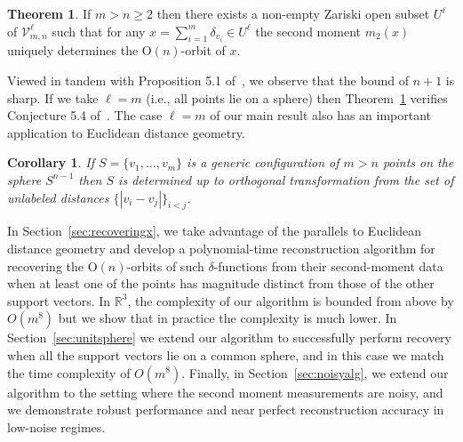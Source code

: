 \documentclass{article}
\newtheorem{Corollary}[]{Corollary}
\theoremstyle{definition}
\newtheorem{Theorem}{Theorem}
\renewcommand{\|}{|}
\newcommand{\V}{\mathcal{V}}
\renewcommand{\O}{\mathrm{O}}
\begin{document}
\begin{Theorem}\label{thm:mainthm}
If $m > n \geq 2$ then there exists a non-empty Zariski open subset $U^{\ell}$ of $\V^{\ell}_{m,n}$ such that for any $
x = \sum_{i=1}^m\delta_{v_i} \in U^\ell$
the second moment $m_2(x)$ uniquely determines the $\O(n)$-orbit of $x$.
\end{Theorem}
Viewed in tandem with Proposition 5.1 of~\cite{bendory2024beltway}, we observe that the bound of $n+1$ is sharp.  If we take $\ell =m$
(i.e., all points lie on a sphere) then 
Theorem~\ref{thm:mainthm} verifies Conjecture 5.4 of~\cite{bendory2024beltway}. 
The case $\ell = m$ of our main result also has an important application
to Euclidean distance geometry. 
\begin{Corollary} \label{cor.interpoint}
If $S = \{v_1, \ldots , v_m\}$ is a generic configuration of $m > n$ points on the sphere $S^{n-1}$
 then $S$ is determined up to orthogonal transformation from the set of unlabeled distances
 $\{|v_i  - v_j|\}_{i < j}$.
\end{Corollary}


In Section~\ref{sec:recoveringx}, we take advantage of the parallels to Euclidean distance geometry and develop a polynomial-time reconstruction algorithm for recovering the $\O(n)$-orbits of such $\delta$-functions
from their second-moment data when at least one of the points has magnitude distinct from those of the other support vectors. In $\mathbb{R}^3$, the complexity of our algorithm is bounded from above by $O(m^8)$ but we show that in practice the complexity is much lower.
In Section~\ref{sec:unitsphere} we extend our algorithm to successfully perform recovery when all
the support vectors lie on a common sphere, 
and in this case we match the time complexity of $O(m^8)$.
Finally, in Section~\ref{sec:noisyalg}, we extend our algorithm to the setting where the second moment measurements are noisy, and we demonstrate robust performance and near perfect reconstruction accuracy in low-noise regimes.
\end{document}
